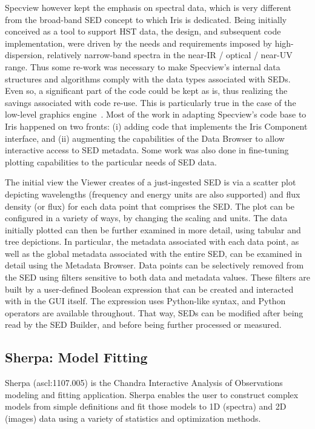 \documentclass[preprint,authoryear,5p]{elsarticle}
\begin{document}
Specview however kept the emphasis on spectral data, which is very different from
the broad-band SED concept to which Iris is dedicated. Being initially conceived
as a tool to support HST data, the design, and subsequent code implementation,
were driven by the needs and requirements imposed by high-dispersion, relatively
narrow-band spectra in the near-IR / optical / near-UV range. Thus some re-work
was necessary to make Specview's internal data structures and algorithms comply with
the data types associated with SEDs. Even so, a significant part of the code
could be kept as is, thus realizing the savings associated with code re-use.
This is particularly true in the case of the low-level graphics
engine~\citep{2000ASPC..216...79B}. Most of the work in adapting Specview's code
base to Iris happened on two fronts: (i) adding code that implements the Iris
Component interface, and (ii) augmenting the capabilities of the Data Browser to
allow interactive access to SED metadata. Some work was also done in fine-tuning
plotting capabilities to the particular needs of SED data.

The initial view the Viewer creates of a just-ingested SED is via a scatter plot
depicting wavelengths (frequency and energy units are also supported) and flux
density (or flux) for each data point that comprises the SED. The plot can be
configured in a variety of ways, by changing the scaling and units. The data
initially plotted can then be further examined in more detail, using tabular and
tree depictions. In particular, the metadata associated with each data point, as
well as the global metadata associated with the entire SED, can be examined in
detail using the Metadata Browser. Data points can be selectively removed from
the SED using filters sensitive to both data and metadata values. These filters
are built by a user-defined Boolean expression that can be created and
interacted with in the GUI itself. The expression uses Python-like syntax, and
Python operators are available throughout. That way, SEDs can be modified after
being read by the SED Builder, and before being further processed or measured.

\subsection{Sherpa: Model Fitting}
\label{subsec:sherpa} 

\begin{sloppypar}
Sherpa (ascl:1107.005) is the Chandra Interactive Analysis of Observations
\citep[CIAO;][ascl:1311.006]{2006SPIE.6270E..60F}
modeling and fitting application. Sherpa enables the user to construct complex
models from simple definitions and fit those models to 1D (spectra) and 2D
(images) data using a variety of statistics and optimization methods.
\end{sloppypar}
\end{document}
